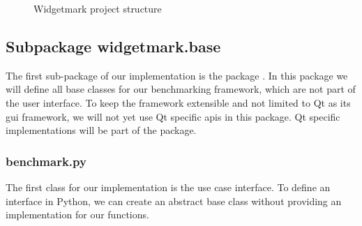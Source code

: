 \begin{figure}[h]
    \centering
    \caption{Widgetmark project structure}
    \label{fig:application:implementation:structure}
\end{figure}

\subsection{Subpackage widgetmark.base}

The first sub-package of our implementation is the package
. In this package we will define all base
classes for our benchmarking framework, which are not part of the user
interface. To keep the framework extensible and not limited to Qt as its
\gls{gui} framework, we will not yet use Qt specific \glspl{api} in this
package. Qt specific implementations will be part of the
 package.

\subsubsection*{benchmark.py}

The first class for our implementation is the use case interface. To define an
interface in Python, we can create an abstract base class without providing an
implementation for our functions.



